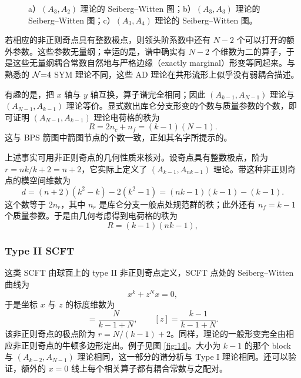\begin{figure}[tbp]
\centering

\caption{a）$(A_3,A_2)$ 理论的 Seiberg--Witten 图；b）$(A_3,A_3)$ 理论的 Seiberg--Witten 图；c）$(A_3,A_4)$ 理论的 Seiberg--Witten 图。}
\label{fig:13}
\end{figure}

若相应的非正则奇点具有整数极点，则领头阶系数中还有 $N-2$ 个可以打开的额外参数。这些参数无量纲；幸运的是，谱中确实有 $N-2$ 个维数为二的算子，于是这些无量纲耦合常数自然地与严格边缘（exactly marginal）形变等同起来。与熟悉的 $\mathcal{N}{=}4$ SYM 理论不同，这些 AD 理论在共形流形上似乎没有弱耦合描述。

有趣的是，把 $x$ 轴与 $y$ 轴互换，算子谱完全相同；因此 $(A_{k-1},A_{N-1})$ 理论与 $(A_{N-1},A_{k-1})$ 理论等价。显式数出库仑分支形变的个数与质量参数的个数，即可证明 $(A_{N-1},A_{k-1})$ 理论电荷格的秩为
\begin{equation}
R = 2n_c+n_f = (k-1)(N-1) .
\label{eq:6.18}\tag{6.18}
\end{equation}
这与 BPS 箭图中箭图节点的个数一致，正如其名字所提示的。

上述事实可用非正则奇点的几何性质来核对。设奇点具有整数极点，阶为 $r=nk/k+2=n+2$，它实际上定义了 $(A_{k-1},A_{nk-1})$ 理论。带这种非正则奇点的模空间维数为
\begin{equation}
d = (n+2)(k^2-k)-2(k^2-1) = (nk-1)(k-1)-(k-1) .
\label{eq:6.19}\tag{6.19}
\end{equation}
这个数等于 $2n_r$，其中 $n_r$ 是库仑分支一般点处规范群的秩；此外还有 $n_f=k-1$ 个质量参数。于是由几何考虑得到电荷格的秩为
\begin{equation}
R = (k-1)(nk-1) ,
\label{eq:6.20}\tag{6.20}
\end{equation}

\subsubsection{Type II SCFT}
\label{sec:6.1.2}

这类 SCFT 由球面上的 type II 非正则奇点定义，SCFT 点处的 Seiberg--Witten 曲线为
\begin{equation}
x^k+z^Nx = 0 ,
\label{eq:6.21}\tag{6.21}
\end{equation}
于是坐标 $x$ 与 $z$ 的标度维数为
\begin{equation}
[x] = \frac{N}{k-1+N},\qquad [z] = \frac{k-1}{k-1+N} .
\label{eq:6.22}\tag{6.22}
\end{equation}
该非正则奇点的极点阶为 $r=N/(k-1)+2$。同样，理论的一般形变完全由相应非正则奇点的牛顿多边形定出。例子见图 \ref{fig:14}。大小为 $k-1$ 的那个 block 与 $(A_{k-2},A_{N-1})$ 理论相同，这一部分的谱分析与 Type I 理论相同。还可以验证，额外的 $x=0$ 线上每个相关算子都有耦合常数与之配对。


